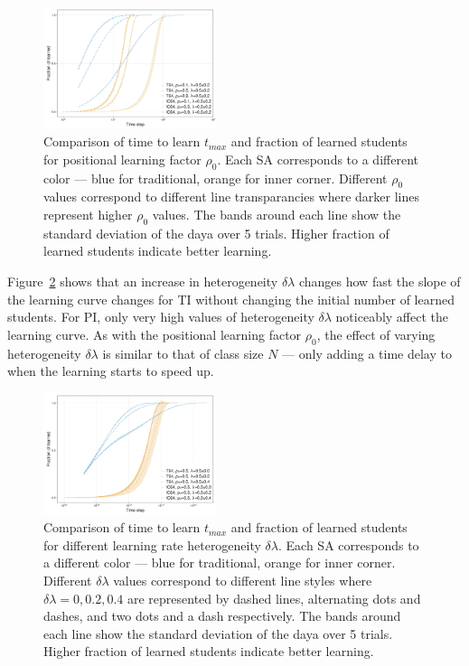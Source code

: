 \documentclass[twocolumn,secnumarabic,amssymb, nobibnotes, aps, prd]{revtex4-2}
\begin{document}
        \begin{figure}[htbp!]
            \centering
            \includegraphics[width=0.45\textwidth]{figures/2D-BPCAIH-analysis/comparison plots/ρ₀.png}
            \caption{Comparison of time to learn $t_{max}$ and fraction of learned students for positional learning factor $\rho_0$.
            Each SA corresponds to a different color --- blue for traditional, orange for inner corner.
            Different $\rho_0$ values correspond to different line transparancies where darker lines represent higher $\rho_0$ values.
            The bands around each line show the standard deviation of the daya over 5 trials.
            Higher fraction of learned students indicate better learning.}
            \label{fig:comparison ρ₀}
        \end{figure}

        Figure~\ref{fig:comparison δλ} shows that an increase in heterogeneity $\delta\lambda$ changes how fast the slope of the learning curve changes for TI without changing the initial number of learned students.
        For PI, only very high values of heterogeneity $\delta\lambda$ noticeably affect the learning curve.
        As with the positional learning factor $\rho_0$, the effect of varying heterogeneity $\delta\lambda$ is similar to that of class size $N$ --- only adding a time delay to when the learning starts to speed up.

        \begin{figure}[htbp!]
            \centering
            \includegraphics[width=0.45\textwidth]{figures/2D-BPCAIH-analysis/comparison plots/δλ.png}
            \caption{Comparison of time to learn $t_{max}$ and fraction of learned students for different learning rate heterogeneity $\delta\lambda$.
            Each SA corresponds to a different color --- blue for traditional, orange for inner corner.
            Different $\delta\lambda$ values correspond to different line styles where $\delta\lambda=0,0.2,0.4$ are represented by dashed lines, alternating dots and dashes, and two dots and a dash respectively.
            The bands around each line show the standard deviation of the daya over 5 trials.
            Higher fraction of learned students indicate better learning.}
            \label{fig:comparison δλ}
        \end{figure}
\end{document}
